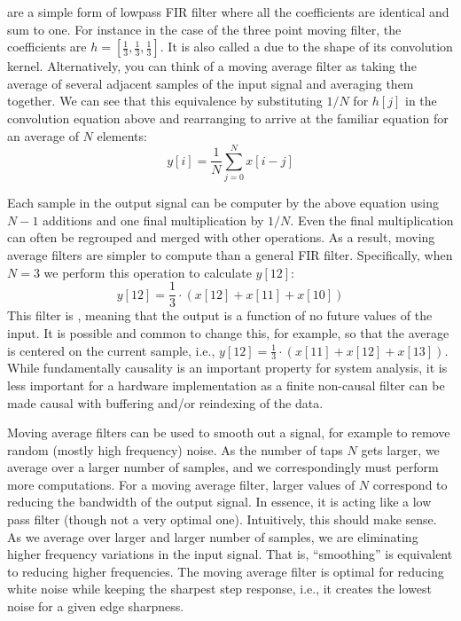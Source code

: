  are a simple form of lowpass FIR filter where all the coefficients are identical and sum to one. For instance in the case of the three point moving filter, the coefficients are $h = [\frac{1}{3}, \frac{1}{3}, \frac{1}{3}]$.  It is also called a  due to the shape of its convolution kernel.  Alternatively, you can think of a moving average filter as taking the average of several adjacent samples of the input signal and averaging them together. We can see that this equivalence by substituting $1/N$ for $h[j]$ in the convolution equation above and rearranging to arrive at the familiar equation for an average of $N$ elements:
\begin{equation}
y[i] = \frac{1}{N} \displaystyle\sum\limits_{j=0}^{N} x[i-j]
\end{equation}

Each sample in the output signal can be computer by the above equation using $N-1$ additions and one final multiplication by $1/N$.  Even the final multiplication can often be regrouped and merged with other operations.  As a result, moving average filters are simpler to compute than a general FIR filter.  Specifically, when $N = 3$ we perform this operation to calculate $y[12]$:
\begin{equation}
y[12] = \frac{1}{3} \cdot (x[12] + x[11] + x[10])
\end{equation}
This filter is , meaning that the output is a function of no future values of the input. It is possible and common to change this, for example, so that the average is centered on the current sample, i.e., $y[12] = \frac{1}{3} \cdot (x[11] + x[12] + x[13])$. While fundamentally causality is an important property for system analysis, it is less important for a hardware implementation as a finite non-causal filter can be made causal with buffering and/or reindexing of the data.

Moving average filters can be used to smooth out a signal, for example to remove random (mostly high frequency) noise.   As the number of taps $N$ gets larger, we average over a larger number of samples, and we correspondingly must perform more computations. For a moving average filter, larger values of $N$ correspond to reducing the bandwidth of the output signal. In essence, it is acting like a low pass filter (though not a very optimal one). Intuitively, this should make sense. As we average over larger and larger number of samples, we are eliminating higher frequency variations in the input signal. That is, ``smoothing'' is equivalent to reducing higher frequencies. The moving average filter is optimal for reducing white noise while keeping the sharpest step response, i.e., it creates the lowest noise for a given edge sharpness.


